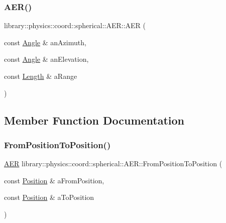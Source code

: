 \subsubsection{\texorpdfstring{A\+E\+R()}{AER()}}
{\footnotesize\ttfamily library\+::physics\+::coord\+::spherical\+::\+A\+E\+R\+::\+A\+ER (\begin{DoxyParamCaption}\item[{const \hyperlink{classlibrary_1_1physics_1_1units_1_1_angle}{Angle} \&}]{an\+Azimuth,  }\item[{const \hyperlink{classlibrary_1_1physics_1_1units_1_1_angle}{Angle} \&}]{an\+Elevation,  }\item[{const \hyperlink{classlibrary_1_1physics_1_1units_1_1_length}{Length} \&}]{a\+Range }\end{DoxyParamCaption})}



\subsection{Member Function Documentation}
\mbox{\label{classlibrary_1_1physics_1_1coord_1_1spherical_1_1_a_e_r_aa068fe79603bc3d6a77d3fc6279e0378}} 
\subsubsection{\texorpdfstring{From\+Position\+To\+Position()}{FromPositionToPosition()}}
{\footnotesize\ttfamily \hyperlink{classlibrary_1_1physics_1_1coord_1_1spherical_1_1_a_e_r}{A\+ER} library\+::physics\+::coord\+::spherical\+::\+A\+E\+R\+::\+From\+Position\+To\+Position (\begin{DoxyParamCaption}\item[{const \hyperlink{classlibrary_1_1physics_1_1coord_1_1_position}{Position} \&}]{a\+From\+Position,  }\item[{const \hyperlink{classlibrary_1_1physics_1_1coord_1_1_position}{Position} \&}]{a\+To\+Position }\end{DoxyParamCaption})\hspace{0.3cm}{\ttfamily [static]}}

